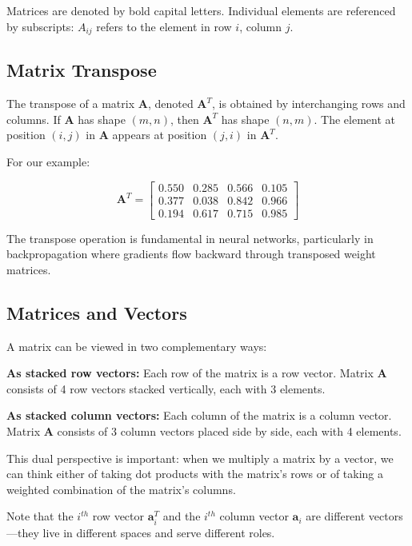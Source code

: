 \documentclass{book}
\begin{document}
Matrices are denoted by bold capital letters. Individual elements are referenced by subscripts: $A_{ij}$ refers to the element in row $i$, column $j$.

\subsection{Matrix Transpose}

The transpose of a matrix $\mathbf{A}$, denoted $\mathbf{A}^T$, is obtained by interchanging rows and columns. If $\mathbf{A}$ has shape $(m, n)$, then $\mathbf{A}^T$ has shape $(n, m)$. The element at position $(i, j)$ in $\mathbf{A}$ appears at position $(j, i)$ in $\mathbf{A}^T$.

For our example:

\begin{equation}
\mathbf{A}^T = \begin{bmatrix}
0.550 & 0.285 & 0.566 & 0.105 \\
0.377 & 0.038 & 0.842 & 0.966 \\
0.194 & 0.617 & 0.715 & 0.985
\end{bmatrix}
\end{equation}

The transpose operation is fundamental in neural networks, particularly in backpropagation where gradients flow backward through transposed weight matrices.

\subsection{Matrices and Vectors}

A matrix can be viewed in two complementary ways:

\textbf{As stacked row vectors:} Each row of the matrix is a row vector. Matrix $\mathbf{A}$ consists of 4 row vectors stacked vertically, each with 3 elements.

\textbf{As stacked column vectors:} Each column of the matrix is a column vector. Matrix $\mathbf{A}$ consists of 3 column vectors placed side by side, each with 4 elements.

This dual perspective is important: when we multiply a matrix by a vector, we can think either of taking dot products with the matrix's rows or of taking a weighted combination of the matrix's columns.

Note that the $i^{th}$ row vector $\mathbf{a}_i^T$ and the $i^{th}$ column vector $\mathbf{a}_i$ are different vectors—they live in different spaces and serve different roles.
\end{document}
